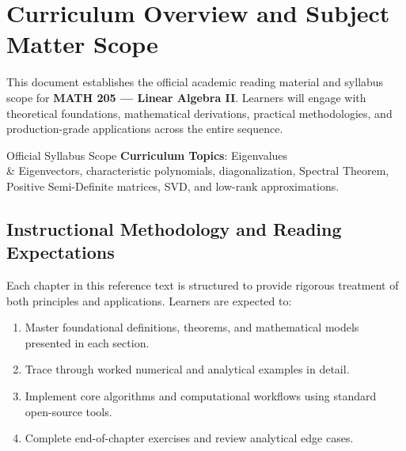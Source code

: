 \section{Curriculum Overview and Subject Matter Scope}

This document establishes the official academic reading material and syllabus scope for \textbf{MATH 205 --- Linear Algebra II}. Learners will engage with theoretical foundations, mathematical derivations, practical methodologies, and production-grade applications across the entire sequence.

\begin{InsightBox}{Official Syllabus Scope}
  \textbf{Curriculum Topics}: Eigenvalues \\& Eigenvectors, characteristic polynomials, diagonalization, Spectral Theorem, Positive Semi-Definite matrices, SVD, and low-rank approximations.
\end{InsightBox}

\subsection{Instructional Methodology and Reading Expectations}

Each chapter in this reference text is structured to provide rigorous treatment of both principles and applications. Learners are expected to:
\begin{enumerate}
  \item Master foundational definitions, theorems, and mathematical models presented in each section.
  \item Trace through worked numerical and analytical examples in detail.
  \item Implement core algorithms and computational workflows using standard open-source tools.
  \item Complete end-of-chapter exercises and review analytical edge cases.
\end{enumerate}

